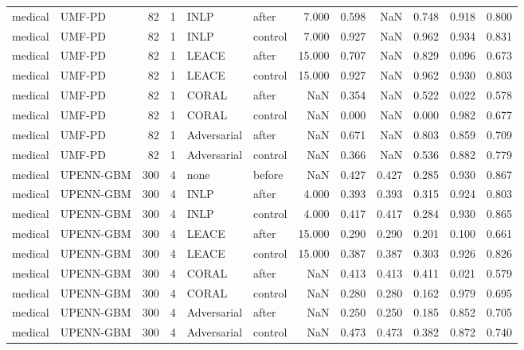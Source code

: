 \begin{tabular}{llrrllrrrrrr}
medical & UMF-PD & 82 & 1 & INLP & after & 7.000 & 0.598 & NaN & 0.748 & 0.918 & 0.800 \\
medical & UMF-PD & 82 & 1 & INLP & control & 7.000 & 0.927 & NaN & 0.962 & 0.934 & 0.831 \\
medical & UMF-PD & 82 & 1 & LEACE & after & 15.000 & 0.707 & NaN & 0.829 & 0.096 & 0.673 \\
medical & UMF-PD & 82 & 1 & LEACE & control & 15.000 & 0.927 & NaN & 0.962 & 0.930 & 0.803 \\
medical & UMF-PD & 82 & 1 & CORAL & after & NaN & 0.354 & NaN & 0.522 & 0.022 & 0.578 \\
medical & UMF-PD & 82 & 1 & CORAL & control & NaN & 0.000 & NaN & 0.000 & 0.982 & 0.677 \\
medical & UMF-PD & 82 & 1 & Adversarial & after & NaN & 0.671 & NaN & 0.803 & 0.859 & 0.709 \\
medical & UMF-PD & 82 & 1 & Adversarial & control & NaN & 0.366 & NaN & 0.536 & 0.882 & 0.779 \\
medical & UPENN-GBM & 300 & 4 & none & before & NaN & 0.427 & 0.427 & 0.285 & 0.930 & 0.867 \\
medical & UPENN-GBM & 300 & 4 & INLP & after & 4.000 & 0.393 & 0.393 & 0.315 & 0.924 & 0.803 \\
medical & UPENN-GBM & 300 & 4 & INLP & control & 4.000 & 0.417 & 0.417 & 0.284 & 0.930 & 0.865 \\
medical & UPENN-GBM & 300 & 4 & LEACE & after & 15.000 & 0.290 & 0.290 & 0.201 & 0.100 & 0.661 \\
medical & UPENN-GBM & 300 & 4 & LEACE & control & 15.000 & 0.387 & 0.387 & 0.303 & 0.926 & 0.826 \\
medical & UPENN-GBM & 300 & 4 & CORAL & after & NaN & 0.413 & 0.413 & 0.411 & 0.021 & 0.579 \\
medical & UPENN-GBM & 300 & 4 & CORAL & control & NaN & 0.280 & 0.280 & 0.162 & 0.979 & 0.695 \\
medical & UPENN-GBM & 300 & 4 & Adversarial & after & NaN & 0.250 & 0.250 & 0.185 & 0.852 & 0.705 \\
medical & UPENN-GBM & 300 & 4 & Adversarial & control & NaN & 0.473 & 0.473 & 0.382 & 0.872 & 0.740 \\
\bottomrule
\end{tabular}
